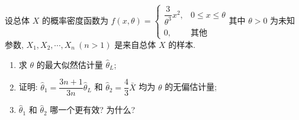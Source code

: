\begin{example}
    设总体 $X$ 的概率密度函数为 $f(x,\theta)=\begin{cases}
        \dfrac{3}{\theta^3}x^2,&0\leqslant x\leqslant \theta\\ 0,&\text{其他}
    \end{cases}$其中 $\theta>0$ 为未知参数, $X_1, X_2, \cdots ,X_n~(n>1)$ 是来自总体 $X$ 的样本.
    \begin{enumerate}[label=(\arabic{*})]
        \item 求 $\theta$ 的最大似然估计量 $\hat{\theta}_L$;
        \item 证明: $\hat{\theta}_1=\dfrac{3n+1}{3n}\hat{\theta}_L$ 和 $\hat{\theta}_2=\dfrac{4}{3}\bar{X}$ 均为 $\theta$ 的无偏估计量;
        \item $\hat{\theta}_1$ 和 $\hat{\theta}_2$ 哪一个更有效? 为什么?
    \end{enumerate}
\end{example}
